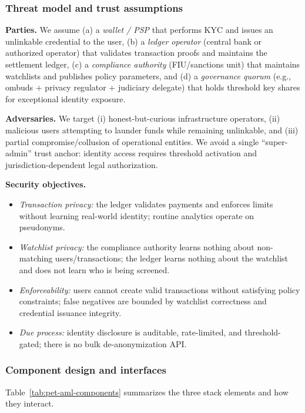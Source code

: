 \documentclass[11pt]{article}
\begin{document}
\subsubsection{Threat model and trust assumptions}
\label{sec:pet-aml-threat-model}

\textbf{Parties.} We assume (a) a \emph{wallet / PSP} that performs KYC and issues an unlinkable credential to the user, (b) a \emph{ledger operator} (central bank or authorized operator) that validates transaction proofs and maintains the settlement ledger, (c) a \emph{compliance authority} (FIU/sanctions unit) that maintains watchlists and publishes policy parameters, and (d) a \emph{governance quorum} (e.g., ombuds + privacy regulator + judiciary delegate) that holds threshold key shares for exceptional identity exposure.

\textbf{Adversaries.} We target (i) honest-but-curious infrastructure operators, (ii) malicious users attempting to launder funds while remaining unlinkable, and (iii) partial compromise/collusion of operational entities. We avoid a single ``super-admin'' trust anchor: identity access requires threshold activation and jurisdiction-dependent legal authorization.

\textbf{Security objectives.}
\begin{itemize}
    \item \emph{Transaction privacy:} the ledger validates payments and enforces limits without learning real-world identity; routine analytics operate on pseudonyms.
    \item \emph{Watchlist privacy:} the compliance authority learns nothing about non-matching users/transactions; the ledger learns nothing about the watchlist and does not learn who is being screened.
    \item \emph{Enforceability:} users cannot create valid transactions without satisfying policy constraints; false negatives are bounded by watchlist correctness and credential issuance integrity.
    \item \emph{Due process:} identity disclosure is auditable, rate-limited, and threshold-gated; there is no bulk de-anonymization API.
\end{itemize}

\subsubsection{Component design and interfaces}
\label{sec:pet-aml-components}

Table~\ref{tab:pet-aml-components} summarizes the three stack elements and how they interact.
\end{document}
